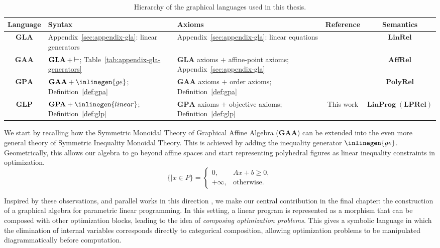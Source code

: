\begin{table}[H]
\centering
\caption{Hierarchy of the graphical languages used in this thesis.}
\label{tab:language-hierarchy}
\small
\begin{tabular}{c p{3.1cm} p{3.5cm} c c}
    \\
\toprule
\textbf{Language} & \textbf{Syntax} & \textbf{Axioms} & \textbf{Reference} & \textbf{Semantics} \\
\midrule
$\mathbf{GLA}$
& Appendix~\ref{sec:appendix-gla}: linear generators
& Appendix~\ref{sec:appendix-gla}: linear equations
& \cite{bonchi2017interacting}
& $\mathbf{LinRel}$ \\
$\mathbf{GAA}$
& $\mathbf{GLA}+\rtop$; Table~\ref{tab:appendix-gla-generators}
& $\mathbf{GLA}$ axioms $+$ affine-point axioms; Appendix~\ref{sec:appendix-gla}
& \cite{bonchi2019affine}
& $\mathbf{AffRel}$ \\
$\mathbf{GPA}$
& $\mathbf{GAA}+\inlinegen{ge}$; Definition~\ref{def:gpa}
& $\mathbf{GAA}$ axioms $+$ order axioms; Definition~\ref{def:gpa}
& \cite{bonchi2021polyhedral}
& $\mathbf{PolyRel}$ \\
$\mathbf{GLP}$
& $\mathbf{GPA}+\inlinegen{linear}$; Definition~\ref{def:glp}
& $\mathbf{GPA}$ axioms $+$ objective axioms; Definition~\ref{def:glp}
& This work
& $\mathbf{LinProg}\;(\mathbf{LPRel})$ \\
\bottomrule
\end{tabular}
\end{table}

We start by recalling how the Symmetric Monoidal Theory of Graphical Affine Algebra (\textbf{GAA}) \cite{bonchi2019affine}
can be extended into the even more general theory of Symmetric Inequality Monoidal Theory.
This is achieved by adding the inequality generator $\inlinegen{ge}$. Geometrically,
this allows our algebra to go beyond affine spaces and start representing polyhedral figures as linear inequality constraints in optimization.
\[
	\{| x \in P\} =
	\begin{cases}
		0, & Ax+b\ge 0,\\
		+\infty, & \text{otherwise}.
	\end{cases}
\]

Inspired by these observations, and parallel works in this direction \cite{stein2024gqa, lawvere1973metric},
we make our central contribution in the final chapter: the construction of
a graphical algebra for parametric linear programming. In this
setting, a linear program is represented as a morphism that
can be composed with other optimization blocks, leading to the idea of
\textit{composing optimization problems}. This gives a symbolic language
in which the elimination of internal variables
corresponds directly to categorical composition, allowing optimization problems
to be manipulated diagrammatically before computation.

